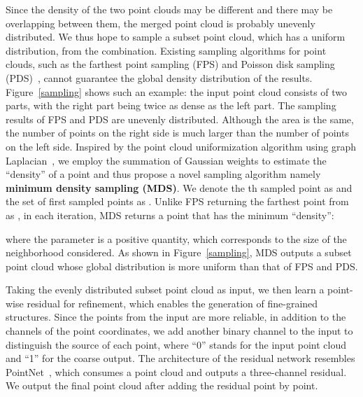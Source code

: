 \documentclass[letterpaper]{article} \usepackage{aaai20}  \usepackage{times}  \usepackage{helvet} \usepackage{courier}  \usepackage[hyphens]{url}  \usepackage{graphicx} \urlstyle{rm} \def\UrlFont{\rm}  \usepackage{graphicx}  \frenchspacing  \setlength{\pdfpagewidth}{8.5in}  \setlength{\pdfpageheight}{11in}  \usepackage{amsmath}
\begin{document}
Since the density of the two point clouds may be different and there may be overlapping between them, the merged point cloud is probably unevenly distributed. We thus hope to sample a subset point cloud, which has a uniform distribution, from the combination. Existing sampling algorithms for point clouds, such as the farthest point sampling (FPS) and Poisson disk sampling (PDS)~\cite{wei2008parallel}, cannot guarantee the global density distribution of the results. Figure~\ref{sampling} shows such an example: the input point cloud consists of two parts, with the right part being twice as dense as the left part. The sampling results of FPS and PDS are unevenly distributed. Although the area is the same, the number of points on the right side is much larger than the number of points on the left side. Inspired by the point cloud uniformization algorithm using graph Laplacian~\cite{luo2018uniformization}, we employ the summation of Gaussian weights to estimate the ``density'' of a point and thus propose a novel sampling algorithm namely \textbf{minimum density sampling (MDS)}. We denote the th sampled point as  and the set of first  sampled points as . Unlike FPS returning the farthest point from  as , in each iteration, MDS returns a point that has the minimum ``density'':
{\small
 
}
where the parameter  is a positive quantity, which corresponds to the size of the neighborhood considered. As shown in Figure~\ref{sampling}, MDS outputs a subset point cloud whose global distribution is more uniform than that of FPS and PDS.

Taking the evenly distributed subset point cloud as input, we then learn a point-wise residual for refinement, which enables the generation of fine-grained structures. Since the points from the input are more reliable, in addition to the channels of the point coordinates, we add another binary channel to the input to distinguish the source of each point, where ``0'' stands for the input point cloud and ``1'' for the coarse output. The architecture of the residual network resembles PointNet~\cite{qi2017pointnet}, which consumes a point cloud and outputs a three-channel residual. We output the final point cloud after adding the residual point by point.
\end{document}
